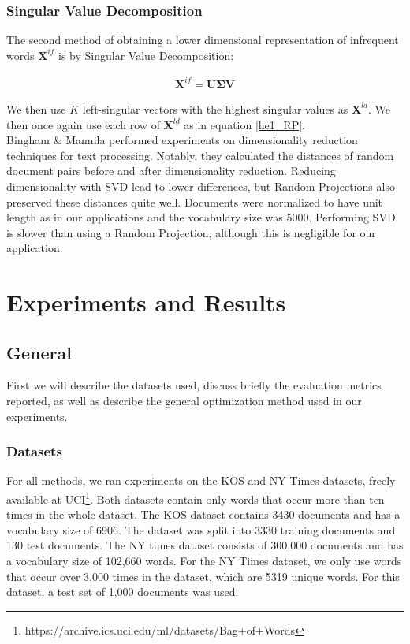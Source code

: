\documentclass{report}
\begin{document}
\subsection{Singular Value Decomposition}\label{SVD}
The second method of obtaining a lower dimensional representation of infrequent words $\mathbf{X}^{if}$ is by Singular Value Decomposition:

\begin{align}
\mathbf{X}^{if} = \mathbf{U\Sigma V}
\end{align}

We then use $K$ left-singular vectors with the highest singular values as $\mathbf{X}^{ld}$. We then once again use each row of $\mathbf{X}^{ld}$ as in equation \ref{he1_RP}.\\
 Bingham \& Mannila \cite{bingham2001random} performed experiments on dimensionality reduction techniques for text processing. Notably, they calculated the distances of random document pairs before and after dimensionality reduction. Reducing dimensionality with SVD lead to lower differences, but Random Projections also preserved these distances quite well. Documents were normalized to have unit length as in our applications and the vocabulary size was 5000. Performing SVD is slower than using a Random Projection, although this is negligible for our application. 


\chapter{Experiments and Results}\label{experiments}
\section{General}
First we will describe the datasets used, discuss briefly the evaluation metrics reported, as well as describe the general optimization method used in our experiments. 
	\subsection{Datasets}\label{datasets}
	For all methods, we ran experiments on the KOS and NY Times datasets, freely available at UCI\footnote{https://archive.ics.uci.edu/ml/datasets/Bag+of+Words}. Both datasets contain only words that occur more than ten times in the whole dataset. The KOS dataset contains 3430 documents and has a vocabulary size of 6906. The dataset was split into 3330 training documents and 130 test documents. The NY times dataset consists of 300,000 documents and has a vocabulary size of 102,660 words. For the NY Times dataset, we only use words that occur over 3,000 times in the dataset, which are 5319 unique words.  For this dataset, a test set of 1,000 documents was used.
	
\end{document}
